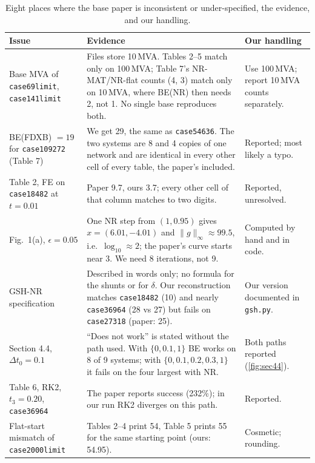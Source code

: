 \documentclass[sigconf,nonacm]{acmart}
\newcommand{\thead}[1]{\textbf{#1}}
\newcommand{\ninf}[1]{\lVert #1\rVert_\infty}
\newcommand{\code}[1]{\texttt{#1}}
\begin{document}
\begin{table}[t]
\centering
\caption{Eight places where the base paper is inconsistent or under-specified, the evidence, and our handling.}
\label{tab:audit}
\footnotesize
\begin{tabularx}{\textwidth}{@{}>{\raggedright\arraybackslash}p{3.6cm} >{\raggedright\arraybackslash}X >{\raggedright\arraybackslash}p{3.6cm}@{}}
\toprule
\thead{Issue} & \thead{Evidence} & \thead{Our handling} \\
\midrule
Base MVA of \code{case69limit}, \code{case141limit} &
Files store 10\,MVA. Tables 2--5 match only on 100\,MVA; Table 7's NR-MAT/NR-flat counts (4, 3) match only on 10\,MVA, where BE(NR) then needs 2, not 1. No single base reproduces both. &
Use 100\,MVA; report 10\,MVA counts separately. \\
BE(FDXB) $=19$ for \code{case109272} (Table 7) &
We get 29, the same as \code{case54636}. The two systems are 8 and 4 copies of one network and are identical in every other cell of every table, the paper's included. &
Reported; most likely a typo. \\
Table 2, FE on \code{case18482} at $t=0.01$ &
Paper 9.7, ours 3.7; every other cell of that column matches to two digits. &
Reported, unresolved. \\
Fig.~1(a), $\epsilon=0.05$ &
One NR step from $(1,0.95)$ gives $x=(6.01,-4.01)$ and $\ninf{g}\approx 99.5$, i.e.\ $\log_{10}\approx2$; the paper's curve starts near 3. We need 8 iterations, not 9. &
Computed by hand and in code. \\
GSH-NR specification &
Described in words only; no formula for the shunts or for $\delta$. Our reconstruction matches \code{case18482} (10) and nearly \code{case36964} (28 vs 27) but fails on \code{case27318} (paper: 25). &
Our version documented in \code{gsh.py}. \\
Section 4.4, $\Delta t_0=0.1$ &
``Does not work'' is stated without the path used. With $\{0,0.1,1\}$ BE works on 8 of 9 systems; with $\{0,0.1,0.2,0.3,1\}$ it fails on the four largest with NR. &
Both paths reported (\cref{fig:sec44}). \\
Table 6, RK2, $t_3=0.20$, \code{case36964} &
The paper reports success (232\%); in our run RK2 diverges on this path. &
Reported. \\
Flat-start mismatch of \code{case2000limit} &
Tables 2--4 print 54, Table 5 prints 55 for the same starting point (ours: 54.95). &
Cosmetic; rounding. \\
\bottomrule
\end{tabularx}
\end{table}
\end{document}
